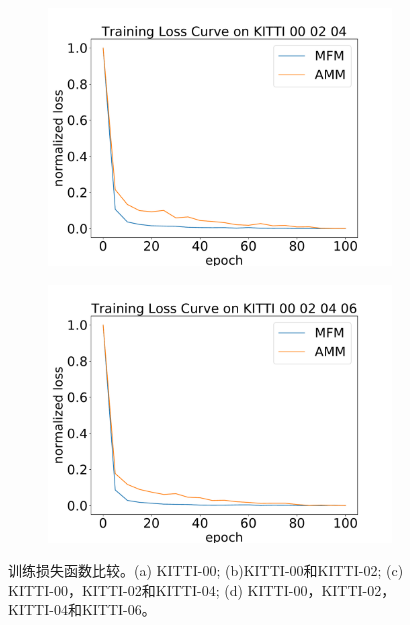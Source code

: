 \begin{figure}[ht]
    \begin{subfigure}[b]{0.225\textwidth}
        \includegraphics[width=\textwidth]{datavo/training_loss_0-4.pdf}
        \caption{}
        \label{fig:tl_024}
    \end{subfigure}
    \begin{subfigure}[b]{0.225\textwidth}
        \includegraphics[width=\textwidth]{datavo/training_loss_0-6.pdf}
        \caption{}
        \label{fig:tl_0246}
    \end{subfigure}
    \caption{训练损失函数比较。(a) KITTI-00; (b)KITTI-00和KITTI-02; (c) KITTI-00，KITTI-02和KITTI-04; (d) KITTI-00，KITTI-02，KITTI-04和KITTI-06。}
    {\label{fig:training_loss}}
\end{figure}

